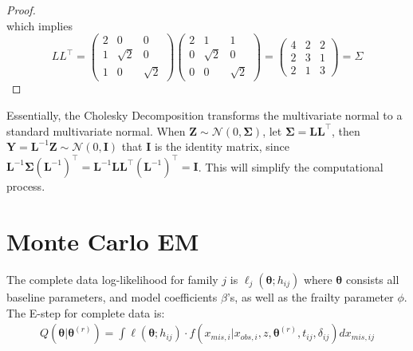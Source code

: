 \documentclass[preprint,12pt]{elsarticle}
\begin{document}
\begin{proof}
\begin{equation}
\end{equation}
which implies
\begin{equation}
    LL^{\top}=
    \begin{pmatrix}
        2 & 0 & 0 \\
        1 & \sqrt{2} & 0\\
        1 & 0 & \sqrt{2}
    \end{pmatrix}
    \begin{pmatrix}
        2 & 1 & 1 \\
        0 & \sqrt{2} & 0 \\
        0 & 0 & \sqrt{2}
    \end{pmatrix}
    =
    \begin{pmatrix}
        4 & 2 & 2\\
        2 & 3 & 1\\
        2 & 1 & 3
    \end{pmatrix}
    =\Sigma
\end{equation}
\end{proof}
Essentially, the Cholesky Decomposition transforms the multivariate normal to a standard multivariate normal. When $\mathbf{Z}\sim \mathcal{N}(0,\boldsymbol{\Sigma})$, let $\boldsymbol{\Sigma}=\mathbf{L}\mathbf{L}^{\top}$, then $\mathbf{Y}=\mathbf{L}^{-1}\mathbf{Z}\sim \mathcal{N}(0, \mathbf{I})$ that $\mathbf{I}$ is the identity matrix, since $\mathbf{L}^{-1}\boldsymbol{\Sigma}(\mathbf{L}^{-1})^{\top}=\mathbf{L}^{-1}\mathbf{L}\mathbf{L}^{\top}(\mathbf{L}^{-1})^{\top}=\mathbf{I}$. This will simplify the computational process. 
\section{Monte Carlo EM}
The complete data log-likelihood for family $j$ is $\ell_j(\boldsymbol{\theta}; h_{ij})$
where $\boldsymbol{\theta}$ consists all baseline parameters, and model coefficients $\beta$'s, as well as the frailty parameter $\phi$. The E-step for complete data is:
\begin{align} 
    Q(\boldsymbol{\theta}|\boldsymbol{\theta}^{(r)})=\int \ell(\boldsymbol{\theta};h_{ij})\cdot f(x_{mis,i}|x_{obs,i},z, \boldsymbol{\theta}^{(r)}, t_{ij}, \delta_{ij})dx_{mis,ij}
\end{align}
\end{document}
